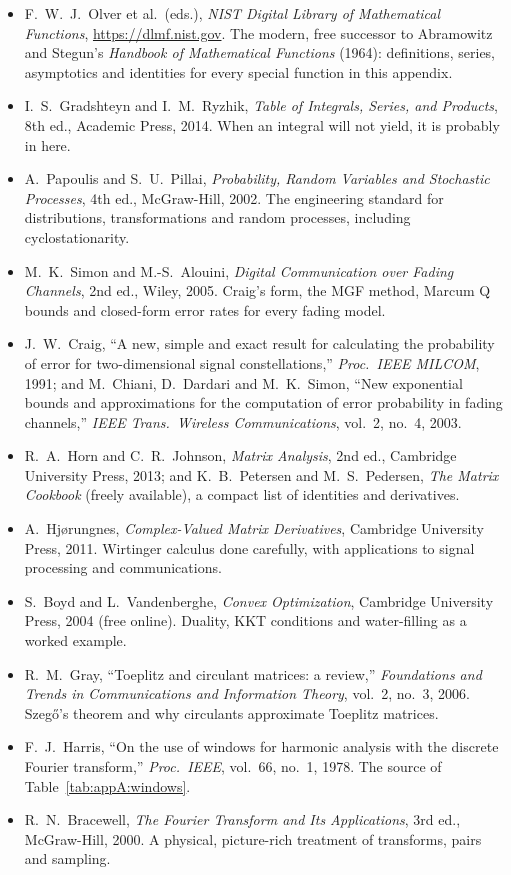 \FloatBarrier
\furtherreading
\begin{itemize}
\item F.~W.~J.~Olver et al.\ (eds.), \emph{NIST Digital Library of Mathematical Functions},
\url{https://dlmf.nist.gov}. The modern, free successor to Abramowitz and Stegun's
\emph{Handbook of Mathematical Functions} (1964): definitions, series, asymptotics and identities
for every special function in this appendix.
\item I.~S.~Gradshteyn and I.~M.~Ryzhik, \emph{Table of Integrals, Series, and Products}, 8th ed.,
Academic Press, 2014. When an integral will not yield, it is probably in here.
\item A.~Papoulis and S.~U.~Pillai, \emph{Probability, Random Variables and Stochastic Processes},
4th ed., McGraw-Hill, 2002. The engineering standard for distributions, transformations and random
processes, including cyclostationarity.
\item M.~K.~Simon and M.-S.~Alouini, \emph{Digital Communication over Fading Channels}, 2nd ed.,
Wiley, 2005. Craig's form, the MGF method, Marcum Q bounds and closed-form error rates for every
fading model.
\item J.~W.~Craig, ``A new, simple and exact result for calculating the probability of error for
two-dimensional signal constellations,'' \emph{Proc.\ IEEE MILCOM}, 1991; and M.~Chiani, D.~Dardari
and M.~K.~Simon, ``New exponential bounds and approximations for the computation of error
probability in fading channels,'' \emph{IEEE Trans.\ Wireless Communications}, vol.~2, no.~4, 2003.
\item R.~A.~Horn and C.~R.~Johnson, \emph{Matrix Analysis}, 2nd ed., Cambridge University Press, 2013;
and K.~B.~Petersen and M.~S.~Pedersen, \emph{The Matrix Cookbook} (freely available), a compact list
of identities and derivatives.
\item A.~Hj{\o}rungnes, \emph{Complex-Valued Matrix Derivatives}, Cambridge University Press, 2011.
Wirtinger calculus done carefully, with applications to signal processing and communications.
\item S.~Boyd and L.~Vandenberghe, \emph{Convex Optimization}, Cambridge University Press, 2004 (free
online). Duality, KKT conditions and water-filling as a worked example.
\item R.~M.~Gray, ``Toeplitz and circulant matrices: a review,'' \emph{Foundations and Trends in
Communications and Information Theory}, vol.~2, no.~3, 2006. Szeg\H{o}'s theorem and why circulants
approximate Toeplitz matrices.
\item F.~J.~Harris, ``On the use of windows for harmonic analysis with the discrete Fourier
transform,'' \emph{Proc.\ IEEE}, vol.~66, no.~1, 1978. The source of Table~\ref{tab:appA:windows}.
\item R.~N.~Bracewell, \emph{The Fourier Transform and Its Applications}, 3rd ed., McGraw-Hill, 2000.
A physical, picture-rich treatment of transforms, pairs and sampling.
\end{itemize}
